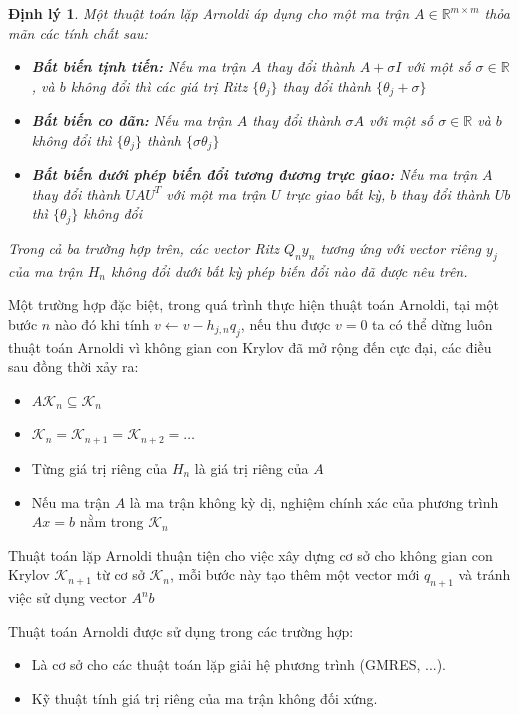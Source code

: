 \documentclass[14pt, a4paper]{article}
\numberwithin{equation}{section}
\numberwithin{algorithm}{section}
\numberwithin{figure}{section}
\newtheorem{dl}{Định lý}
\numberwithin{dl}{section}
\numberwithin{md}{section}
\numberwithin{bd}{section}
\numberwithin{dn}{section}
\numberwithin{hq}{section}
\begin{document}
\begin{dl} \label{dl:Arnoldi_Properties}
    Một thuật toán lặp Arnoldi áp dụng cho một ma trận $A \in \mathbb{R}^{m \times m}$ thỏa mãn các tính chất sau:
    \begin{itemize}
        \item \textbf{Bất biến tịnh tiến:} Nếu ma trận $A$ thay đổi thành $A + \sigma I $ với một số $\sigma \in \mathbb{R}$, và $b$ không đổi thì các giá trị Ritz $\lbrace \theta_j \rbrace$ thay đổi thành $\lbrace \theta_j + \sigma \rbrace$
        \item \textbf{Bất biến co dãn:} Nếu ma trận $A$ thay đổi thành $\sigma A$ với một số $\sigma \in \mathbb{R}$ và $b$ không đổi thì $\lbrace \theta_j \rbrace$ thành $\lbrace \sigma \theta_j \rbrace$
        \item \textbf{Bất biến dưới phép biến đổi tương đương trực giao:} Nếu ma trận $A$ thay đổi thành $UAU^T$ với một ma trận $U$ trực giao bất kỳ, $b$ thay đổi thành $Ub$ thì $\lbrace \theta_j \rbrace$ không đổi
    \end{itemize}
    Trong cả ba trường hợp trên, các vector Ritz $Q_n y_n$ tương ứng với vector riêng $y_j$ của ma trận $H_n$ không đổi dưới bất kỳ phép biến đổi nào đã được nêu trên.
\end{dl}

Một trường hợp đặc biệt, trong quá trình thực hiện thuật toán Arnoldi, tại một bước $n$ nào đó khi tính $v \leftarrow v - h_{j,n}q_j$, nếu thu được $v=0$ ta có thể dừng luôn thuật toán Arnoldi vì không gian con Krylov đã mở rộng đến cực đại, các điều sau đồng thời xảy ra:


\begin{itemize}
    \item $A\mathcal{K}_n \subseteq  \mathcal{K}_n$
    \item $\mathcal{K}_n=\mathcal{K}_{n+1}=\mathcal{K}_{n+2}=\dots$
    \item Từng giá trị riêng của $ H_n$ là giá trị riêng của $A$
    \item Nếu ma trận $A$ là ma trận không kỳ dị, nghiệm chính xác của phương trình $Ax=b$ nằm trong $\mathcal{K}_n$
\end{itemize}


Thuật toán lặp Arnoldi thuận tiện cho việc xây dựng cơ sở cho không gian con Krylov $\mathcal{K}_{n+1}$ từ cơ sở $\mathcal{K}_n$, mỗi bước này tạo thêm một vector mới $q_{n+1}$ và tránh việc sử dụng vector $A^n b$

Thuật toán Arnoldi được sử dụng trong các trường hợp:
\begin{itemize}
    \item Là cơ sở cho các thuật toán lặp giải hệ phương trình (GMRES, ...).
    \item Kỹ thuật tính giá trị riêng của ma trận không đối xứng.
\end{itemize}
\end{document}
